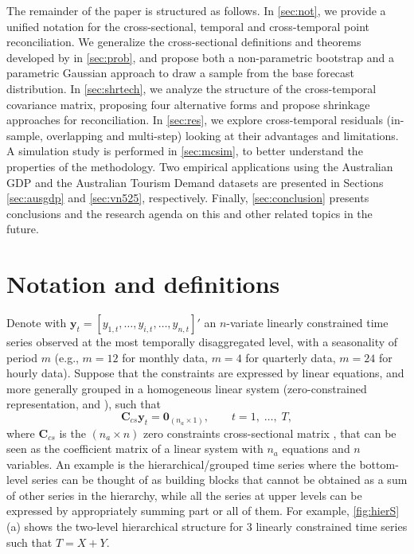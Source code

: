 \documentclass[a4paper,11pt]{article}
\newcommand{\yvet}{\bm{y}}
\newcommand{\Cvet}{\bm{C}}
\newcommand{\Zerovet}{\bm{0}}
\theoremstyle{definition}
\begin{document}
The remainder of the paper is structured as follows.
In \autoref{sec:not}, we provide a unified notation for the cross-sectional, temporal and cross-temporal point reconciliation.
We generalize the cross-sectional definitions and theorems developed by \cite{panagiotelis2023} in \autoref{sec:prob}, and propose both a non-parametric bootstrap and a parametric Gaussian approach to draw a sample from the base forecast distribution.
In \autoref{sec:shrtech}, we analyze the structure of the cross-temporal covariance matrix, proposing four alternative forms and propose shrinkage approaches for reconciliation.
In \autoref{sec:res}, we explore cross-temporal residuals (in-sample, overlapping and multi-step) looking at their advantages and limitations.
A simulation study is performed in \autoref{sec:mcsim}, to better understand the properties of the methodology.
Two empirical applications using the Australian GDP and the Australian Tourism Demand datasets are presented in Sections \ref{sec:ausgdp} and \ref{sec:vn525}, respectively.
Finally, \autoref{sec:conclusion} presents conclusions and the research agenda on this and other related topics in the future.

\section{Notation and definitions}\label{sec:not}


Denote with $\yvet_t = [y_{1,t},\dots,y_{i,t},\dots,y_{n,t}]'$ an $n$-variate linearly constrained time series observed at the most temporally disaggregated level, with a seasonality of period $m$ (e.g., $m = 12$ for monthly data, $m = 4$ for quarterly data, $m = 24$ for hourly data). Suppose that the constraints are expressed by linear equations, and more generally grouped in a homogeneous linear system (zero-constrained representation, \citealp{wickramasuriya2019} and  \citealp{difonzo2023}), such that
\begin{equation}
	\label{eq:cs_con}
	\Cvet_{cs}\yvet_t = \Zerovet_{(n_a \times 1)}, \qquad t = 1, \;\dots, \;T,
\end{equation}
where $\Cvet_{cs}$ is the $(n_a \times n)$ zero constraints cross-sectional matrix , that can be seen as the coefficient matrix of a linear system with $n_a$ equations and $n$ variables. An example is the hierarchical/grouped time series where the bottom-level series can be thought of as building blocks that cannot be obtained as a sum of other series in the hierarchy, while all the series at upper levels can be expressed by appropriately summing part or all of them. For example, \autoref{fig:hierS}(a) shows the two-level hierarchical structure for 3 linearly constrained time series such that $T = X + Y$.
\end{document}
